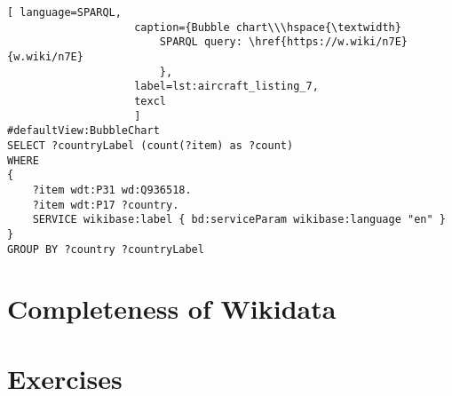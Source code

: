 \begin{lstlisting}[ language=SPARQL, 
                    caption={Bubble chart\\\hspace{\textwidth}
                        SPARQL query: \href{https://w.wiki/n7E}{w.wiki/n7E}
                        },
                    label=lst:aircraft_listing_7,
                    texcl 
                    ]
#defaultView:BubbleChart
SELECT ?countryLabel (count(?item) as ?count)
WHERE
{
    ?item wdt:P31 wd:Q936518.
  	?item wdt:P17 ?country.
    SERVICE wikibase:label { bd:serviceParam wikibase:language "en" }
}
GROUP BY ?country ?countryLabel
\end{lstlisting}


\section{Completeness of Wikidata}


\section{Exercises}
